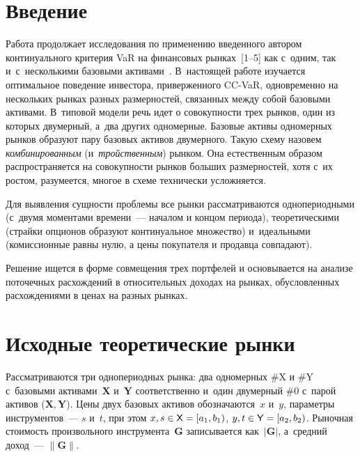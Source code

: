   
\vspace*{-3pt}



\thispagestyle{headings}

\begin{multicols}{2}

\label{st\stat}
  
  \section{Введение}
  
  Работа продолжает исследования по применению введенного автором 
континуального критерия VaR  на финансовых рынках~[1--5] как 
с~одним, так и~с~несколькими базовыми активами~\cite{3-ag}. В~настоящей 
работе изучается оптимальное поведение инвестора, приверженного CC-VaR, 
одновременно на нескольких рынках разных размерностей, связанных между 
собой базовыми активами. В~типовой модели речь идет о совокупности трех 
рынков, один из которых двумерный, а~два других одномерные. Базовые 
активы одномерных рынков образуют пару базовых активов двумерного. 
Такую схему назовем \textit{комбинированным} (и~\textit{тройственным}) 
рынком. Она естественным образом распространяется на совокупности рынков 
больших размерностей, хотя с~их ростом, разумеется, многое в схеме 
технически усложняется.
  
  Для выявления сущности проблемы все рынки рассматриваются 
однопериодными (с~двумя моментами времени~--- началом и концом периода), 
теоретическими (страйки опционов образуют континуальное множество) 
и~идеальными (комиссионные равны нулю, а цены покупателя и продавца 
совпадают). 
  
  Решение ищется в форме совмещения трех портфелей и основывается на 
анализе поточечных расхождений в относительных доходах на рынках, 
обусловленных расхождениями в ценах на разных \mbox{рынках}. 

\vspace*{-6pt}
  
  \section{Исходные теоретические рынки}
  
  \vspace*{-2pt}
  
  Рассматриваются три однопериодных рынка: два одномерных \#X и \#Y 
  с~базовыми активами~$\boldsymbol{X}$ и~$\boldsymbol{Y}$ соответственно 
и~один двумерный \#0 с~парой активов ($\boldsymbol{X}, \boldsymbol{Y}$). 
Цены двух базовых активов обозначаются~$x$ и~$y$, параметры 
инструментов~--- $s$ и~$t$, при этом $x, s \hm\in {\sf X}\hm = [a_1, b_1)$, $y, t 
\hm\in {\sf Y}\hm = [a_2, b_2)$. Рыночная стоимость произвольного 
инструмента~$\boldsymbol{G}$ записывается как~$\vert\boldsymbol{G}\vert$, 
а~средний доход~--- $\|\boldsymbol{G}\|$.
  

\end{multicols}
